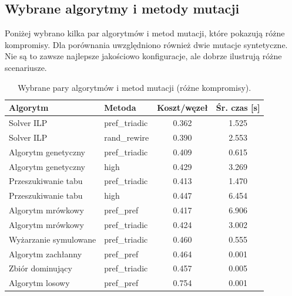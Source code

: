 \subsection{Wybrane algorytmy i metody mutacji}
Poniżej wybrano kilka par algorytmów i metod mutacji, które pokazują różne kompromisy. Dla porównania uwzględniono również dwie mutacje syntetyczne. Nie są to zawsze najlepsze jakościowo konfiguracje, ale dobrze ilustrują różne scenariusze.

\begin{table}[H]
  \centering
  \caption{Wybrane pary algorytmów i metod mutacji (różne kompromisy).}
  \label{tab:dyn-synth-selected-best}
  \begin{tabular}{llcc}
    \toprule
    \textbf{Algorytm}     & \textbf{Metoda} & \textbf{Koszt/węzeł} & \textbf{Śr. czas [s]} \\
    \midrule
    Solver ILP            & pref\_triadic   & 0.362                & 1.525                 \\
    Solver ILP            & rand\_rewire    & 0.390                & 2.553                 \\
    Algorytm genetyczny   & pref\_triadic   & 0.409                & 0.615                 \\
    Algorytm genetyczny   & high            & 0.429                & 3.269                 \\
    Przeszukiwanie tabu   & pref\_triadic   & 0.413                & 1.470                 \\
    Przeszukiwanie tabu   & high            & 0.447                & 6.454                 \\
    Algorytm mrówkowy     & pref\_pref      & 0.417                & 6.906                 \\
    Algorytm mrówkowy     & pref\_triadic   & 0.424                & 3.002                 \\
    Wyżarzanie symulowane & pref\_triadic   & 0.460                & 0.555                 \\
    Algorytm zachłanny    & pref\_pref      & 0.464                & 0.001                 \\
    Zbiór dominujący      & pref\_triadic   & 0.457                & 0.005                 \\
    Algorytm losowy       & pref\_pref      & 0.754                & 0.001                 \\
    \bottomrule
  \end{tabular}
\end{table}

